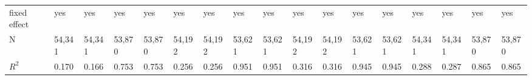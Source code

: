 \begin{tabular}{lllllllllllllllll}
fixed effect                 &                                 yes &                                 yes &                                 yes &                                 yes &                                 yes &                                 yes &                                 yes &                                 yes &                                 yes &                                 yes &                                 yes &                                 yes &                                 yes &                                yes &                                yes &                                yes \\
N                            &                              54,341 &                              54,341 &                              53,870 &                              53,870 &                              54,192 &                              54,192 &                              53,621 &                              53,621 &                              54,192 &                              54,192 &                              53,621 &                              53,621 &                              54,341 &                             54,341 &                             53,870 &                             53,870 \\
$R^2$                        &                               0.170 &                               0.166 &                               0.753 &                               0.753 &                               0.256 &                               0.256 &                               0.951 &                               0.951 &                               0.316 &                               0.316 &                               0.945 &                               0.945 &                               0.288 &                              0.287 &                              0.865 &                              0.865 \\
\bottomrule
\end{tabular}
